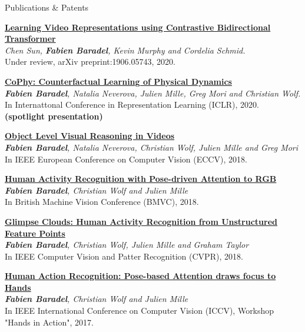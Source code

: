\documentclass{resume} %
\begin{document}
\newpage

\begin{rSection}{Publications \& Patents}
        \vspace{-1em}
        \item \href{https://arxiv.org/abs/1906.05743}{\textbf{Learning Video Representations using Contrastive Bidirectional Transformer}} \\ 
        \textit{Chen Sun, \textbf{Fabien Baradel}, Kevin Murphy and Cordelia Schmid.} \\ Under review, arXiv preprint:1906.05743, 2020. \vspace{0.3em}
        \item \href{https://openreview.net/forum?id=SkeyppEFvS}{\textbf{CoPhy: Counterfactual Learning of Physical Dynamics}} \\ \textit{\textbf{Fabien Baradel}, Natalia Neverova, Julien Mille, Greg Mori and Christian Wolf.} \\In Internattonal Conference in Representation Learning (ICLR), 2020. \textbf{(spotlight presentation)} \vspace{0.3em}
        \item \href{https://arxiv.org/abs/1806.06157}{\textbf{Object Level Visual Reasoning in Videos}} \\ \textit{\textbf{Fabien Baradel}, Natalia Neverova, Christian Wolf, Julien Mille and Greg Mori} \\ In IEEE European Conference on Computer Vision (ECCV), 2018. \vspace{0.3em}
        \item \href{https://hal.inria.fr/hal-01828083}{\textbf{Human Activity Recognition with Pose-driven Attention to RGB}} \\ \textit{\textbf{Fabien Baradel}, Christian Wolf and Julien Mille} \\ In British Machine Vision Conference (BMVC), 2018.
        \item \href{https://arxiv.org/abs/1802.07898}{\textbf{Glimpse Clouds: Human Activity Recognition from Unstructured Feature Points}} \\ \textit{\textbf{Fabien Baradel}, Christian Wolf, Julien Mille and Graham Taylor} \\ In IEEE Computer Vision and Patter Recognition (CVPR), 2018. \vspace{0.3em}
        \item \href{https://arxiv.org/abs/1712.08002}{\textbf{Human Action Recognition: Pose-based Attention draws focus to Hands}} \\ \textit{\textbf{Fabien Baradel}, Christian Wolf and Julien Mille} \\ In IEEE International Conference on Computer Vision (ICCV), Workshop "Hands in Action", 2017. \vspace{0.3em}

\end{rSection}
\end{document}
